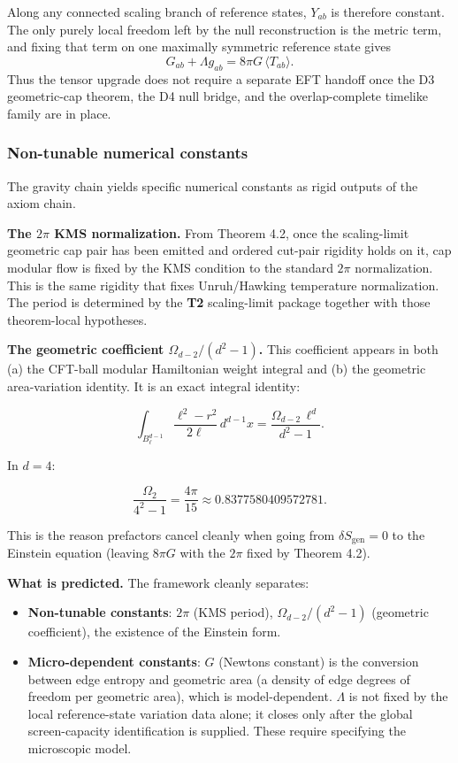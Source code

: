 Along any connected scaling branch of reference states, \(Y_{ab}\) is therefore constant. The only purely local freedom left by the null reconstruction is the metric term, and fixing that term on one maximally symmetric reference state gives
\[
G_{ab}+\Lambda g_{ab}=8\pi G\,\langle T_{ab}\rangle.
\]
Thus the tensor upgrade does not require a separate EFT handoff once the D3 geometric-cap theorem, the D4 null bridge, and the overlap-complete timelike family are in place.

\subsubsection{Non-tunable numerical constants}\label{58-non-tunable-numerical-constants}

The gravity chain yields specific numerical constants as rigid outputs of the axiom chain.

\textbf{The \(2\pi\) KMS normalization.} From Theorem 4.2, once the scaling-limit geometric cap pair has been emitted and ordered cut-pair rigidity holds on it, cap modular flow is fixed by the KMS condition to the standard \(2\pi\) normalization. This is the same rigidity that fixes Unruh/Hawking temperature normalization. The period is determined by the \textbf{T2} scaling-limit package together with those theorem-local hypotheses.

\textbf{The geometric coefficient \(\Omega_{d-2}/(d^2 - 1)\).} This coefficient appears in both (a) the CFT-ball modular Hamiltonian weight integral and (b) the geometric area-variation identity. It is an exact integral identity:

\[
\int_{B^{d-1}_\ell} \frac{\ell^2 - r^2}{2\ell} \, d^{d-1}x
= \frac{\Omega_{d-2} \, \ell^d}{d^2 - 1}.
\]

In \(d = 4\):

\[
\frac{\Omega_2}{4^2 - 1} = \frac{4\pi}{15} \approx 0.8377580409572781.
\]

This is the reason prefactors cancel cleanly when going from \(\delta S_{\mathrm{gen}} = 0\) to the Einstein equation (leaving \(8\pi G\) with the \(2\pi\) fixed by Theorem 4.2).

\textbf{What is predicted.} The framework cleanly separates:

\begin{itemize}
\tightlist
\item
  \textbf{Non-tunable constants}: \(2\pi\) (KMS period), \(\Omega_{d-2}/(d^2-1)\) (geometric coefficient), the existence of the Einstein form.
\item
  \textbf{Micro-dependent constants}: \(G\) (Newton\textquotesingle s constant) is the conversion between edge entropy and geometric area (a density of edge degrees of freedom per geometric area), which is model-dependent. \(\Lambda\) is not fixed by the local reference-state variation data alone; it closes only after the global screen-capacity identification is supplied. These require specifying the microscopic model.
\end{itemize}

